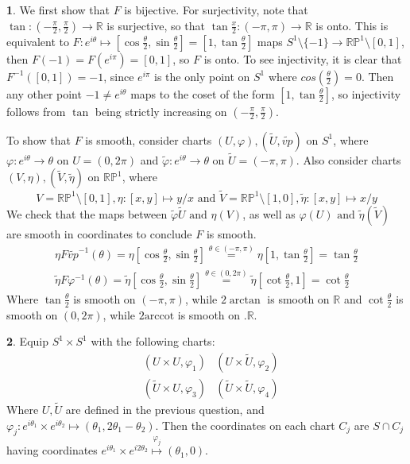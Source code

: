 \documentclass[10.5pt]{article}
\theoremstyle{definition}
\newtheorem{pb}{}
\newcommand{\set}[1]{\{#1\}}
\newcommand{\tand}{\text{ and }}
\newcommand{\vp}{\varphi}
\begin{document}
    \begin{pb}
        We first show that \(F\) is bijective. For surjectivity, note that \(\tan: (-\frac{\pi}{2},\frac{\pi}{2}) \to \mathbb{R}\) is surjective, so that
        \(\tan \frac{x}{2}: (-\pi,\pi) \to \mathbb{R}\) is onto. This is equivalent to \(F: e^{i\theta} \mapsto [\cos \frac{\theta}{2}, \sin \frac{\theta}{2}] = [1,\tan \frac{\theta}{2}]\)
        maps \(S^1 \setminus \set{-1} \to \mathbb{RP}^1 \setminus [0,1]\), then \(F(-1) = F(e^{i\pi}) = [0,1]\), so \(F\) is onto. To see injectivity, it is clear that
        \(F^{-1}([0,1]) = -1\), since \(e^{i\pi}\) is the only point on \(S^1\) where \(cos(\frac{\theta}{2}) = 0\). Then any other point \(-1 \neq e^{i\theta}\) maps to the coset of the form
        \([1,\tan \frac{\theta}{2}]\), so injectivity follows from \(\tan\) being strictly increasing on \((-\frac{\pi}{2}, \frac{\pi}{2})\).

        To show that \(F\) is smooth, consider charts \((U,\vp), (\tilde{U},\tilde{vp})\) on \(S^1\), where \(\vp: e^{i\theta} \to \theta\) on \(U = (0,2\pi)\) and 
        \(\tilde{\vp}: e^{i\theta} \to \theta\) on
        \(\tilde{U} = (-\pi,\pi)\). Also consider charts \((V,\eta), (\tilde{V},\tilde{\eta})\) on \(\mathbb{RP}^1\), where 
        \[V = \mathbb{RP}^1 \setminus [0,1], \eta: [x,y] \mapsto y/x \tand \tilde{V} = \mathbb{RP}^1 \setminus [1,0], \tilde{\eta}: [x,y] \mapsto x/y\]
        We check that the maps between \(\tilde{\vp}\tilde{U} \tand \eta(V)\), as well as \(\vp(U) \tand \tilde{\eta}(\tilde{V})\) are smooth in coordinates to conclude \(F\) is smooth.
        \begin{align*}
            \eta F \tilde{vp}^{-1} (\theta) = \eta [\cos \frac{\theta}{2}, \sin \frac{\theta}{2}] \overset{\theta \in (-\pi,\pi)}{=} \eta [1, \tan \frac{\theta}{2}] = \tan \frac{\theta}{2} \\
            \tilde{\eta} F \vp^{-1} (\theta) = \tilde{\eta} [\cos \frac{\theta}{2}, \sin \frac{\theta}{2}] \overset{\theta \in (0,2\pi)}{=} \tilde{\eta} [\cot \frac{\theta}{2},1] = \cot \frac{\theta}{2}
        \end{align*}
        Where \(\tan \frac{\theta}{2}\) is smooth on \((-\pi,\pi)\), while \(2\arctan\) is smooth on \(\mathbb{R}\) and \(\cot \frac{\theta}{2}\) is smooth on \((0,2\pi)\), while \(2\text{arccot}\) is smooth on .\(\mathbb{R}\).
    \end{pb}
    \begin{pb}
        Equip \(S^1 \times S^1\) with the following charts:
        \begin{align*}
            &(U \times U, \vp_1) &(U \times \tilde{U}, \vp_2) \\
            &(\tilde{U} \times U, \vp_3) &(\tilde{U} \times \tilde{U}, \vp_4)
        \end{align*}
        Where \(U, \tilde{U}\) are defined in the previous question, and \(\vp_j: e^{i\theta_1} \times e^{i\theta_2} \mapsto (\theta_1,2\theta_1 - \theta_2)\).
        Then the coordinates on each chart \(C_j\) are \(S \cap C_j\) having coordinates \(e^{i\theta_1} \times e^{i2\theta_2} \overset{\vp_j}{\mapsto} (\theta_1,0)\).
    \end{pb}
\end{document}
